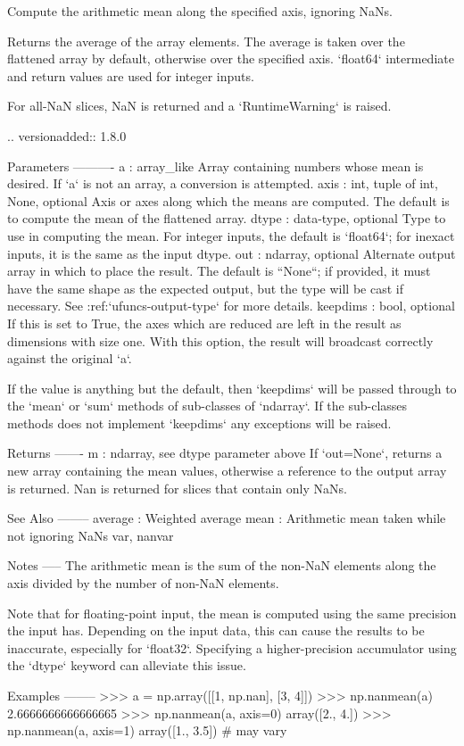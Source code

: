 \begin{DoxyVerb}Compute the arithmetic mean along the specified axis, ignoring NaNs.

Returns the average of the array elements.  The average is taken over
the flattened array by default, otherwise over the specified axis.
`float64` intermediate and return values are used for integer inputs.

For all-NaN slices, NaN is returned and a `RuntimeWarning` is raised.

.. versionadded:: 1.8.0

Parameters
----------
a : array_like
    Array containing numbers whose mean is desired. If `a` is not an
    array, a conversion is attempted.
axis : {int, tuple of int, None}, optional
    Axis or axes along which the means are computed. The default is to compute
    the mean of the flattened array.
dtype : data-type, optional
    Type to use in computing the mean.  For integer inputs, the default
    is `float64`; for inexact inputs, it is the same as the input
    dtype.
out : ndarray, optional
    Alternate output array in which to place the result.  The default
    is ``None``; if provided, it must have the same shape as the
    expected output, but the type will be cast if necessary. See
    :ref:`ufuncs-output-type` for more details.
keepdims : bool, optional
    If this is set to True, the axes which are reduced are left
    in the result as dimensions with size one. With this option,
    the result will broadcast correctly against the original `a`.

    If the value is anything but the default, then
    `keepdims` will be passed through to the `mean` or `sum` methods
    of sub-classes of `ndarray`.  If the sub-classes methods
    does not implement `keepdims` any exceptions will be raised.

Returns
-------
m : ndarray, see dtype parameter above
    If `out=None`, returns a new array containing the mean values,
    otherwise a reference to the output array is returned. Nan is
    returned for slices that contain only NaNs.

See Also
--------
average : Weighted average
mean : Arithmetic mean taken while not ignoring NaNs
var, nanvar

Notes
-----
The arithmetic mean is the sum of the non-NaN elements along the axis
divided by the number of non-NaN elements.

Note that for floating-point input, the mean is computed using the same
precision the input has.  Depending on the input data, this can cause
the results to be inaccurate, especially for `float32`.  Specifying a
higher-precision accumulator using the `dtype` keyword can alleviate
this issue.

Examples
--------
>>> a = np.array([[1, np.nan], [3, 4]])
>>> np.nanmean(a)
2.6666666666666665
>>> np.nanmean(a, axis=0)
array([2.,  4.])
>>> np.nanmean(a, axis=1)
array([1.,  3.5]) # may vary\end{DoxyVerb}
